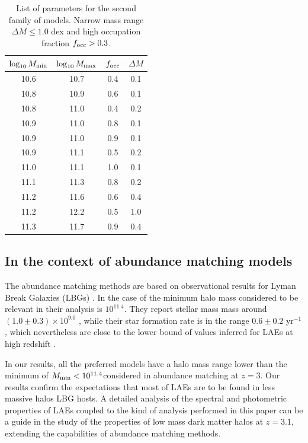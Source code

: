 \documentclass[usenatbib]{mn2e}
\newcommand{\hMsun}{{\ifmmode{h^{-1}{\rm
        {M_{\odot}}}}\else{$h^{-1}{\rm{M_{\odot}}}$}\fi}}
\newcommand{\Msun}{{\ifmmode{{\rm {M_{\odot}}}}\else{${\rm{M_{\odot}}}$}\fi}}
\begin{document}
\begin{table}
\begin{center}
\begin{tabular}{cccc}\hline\hline
$\log_{10}M_{\rm min}$ & $\log_{10}M_{\rm max}$ & $f_{\rm occ}$ & $\Delta M$\\\hline
10.6 &10.7 &0.4 & 0.1\\
10.8 &10.9 &0.6 & 0.1\\
10.8 &11.0 &0.4 & 0.2\\
10.9 &11.0 &0.8 & 0.1\\
10.9 &11.0 &0.9 & 0.1\\
10.9 &11.1 &0.5 & 0.2\\
11.0 &11.1 &1.0 & 0.1\\
11.1 &11.3 &0.8 & 0.2\\
11.2 &11.6 &0.6 & 0.4\\
11.2 &12.2 &0.5 & 1.0\\
11.3 &11.7 &0.9 & 0.4\\\hline
\end{tabular}
\end{center}
\caption{\label{table:secondfamily}List of parameters for the second
  family of models. Narrow mass range $\Delta M\leq 1.0$ dex and high occupation fraction $f_{\rm occ}>0.3$.}
\end{table}

\subsection{In the context of abundance matching models}

The abundance matching methods are based on observational results for
Lyman Break Galaxies (LBGs) \citep{Behroozi2013a,Behroozi2013b}.  In
the case of \cite{Behroozi2013a} the minimum halo mass considered to
be relevant in their analysis is $10^{11.4}$\hMsun. They report
stellar mass mass around $(1.0\pm0.3)\times 10^{9.0}$ \hMsun, while
their star formation rate is in the range $0.6\pm 0.2$ \Msun yr$^{-1}$,
which nevertheless are close to the lower bound of values inferred for
LAEs at high redshift \citep{Gawiser2007,Nilsson2009,Pentericci2009}. 

In our results, all the preferred models have a halo mass range lower
than the minimum of $M_{\rm min}<10^{11.4}$\hMsun considered in
abundance matching at $z=3$. Our results confirm the expectations
that most of  LAEs are to be found in less massive halos LBG hosts. A
detailed analysis of the spectral and photometric properties of LAEs
coupled to the kind of analysis performed in this paper can be a guide
in the study of the properties of low mass dark matter halos at
$z=3.1$, extending the capabilities of abundance matching methods.
\end{document}
